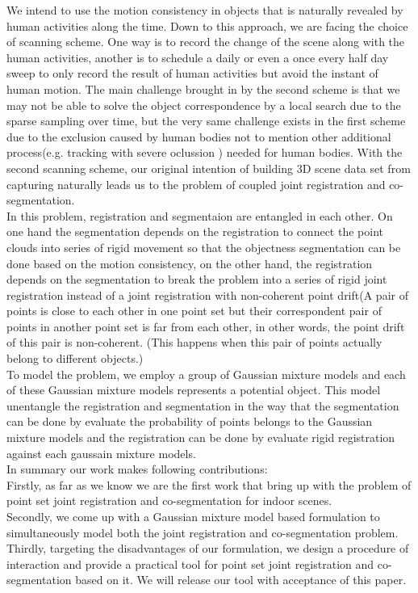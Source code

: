 We intend to use the motion consistency in objects that is naturally revealed by human activities along the time. Down to this approach, we are facing the choice of scanning scheme. One way is to record the change of the scene along with the human activities, another is to  schedule a daily or even a once every half day sweep to only record the result of human activities but avoid the instant of human motion. The main challenge brought in by the second scheme is that we may not be able to solve the object correspondence by a local search due to the sparse sampling over time, but the very same challenge exists in the first scheme due to the exclusion caused by human bodies not to mention other additional process(e.g. tracking with severe oclussion ) needed for human bodies. With the second scanning scheme, our original intention of building 3D scene data set from capturing naturally leads us to the problem of coupled joint registration and co-segmentation.\\ 
In this problem, registration and segmentaion are entangled in each other. On one hand the segmentation depends on the registration to connect the point clouds into series of rigid movement so that the objectness segmentation can be done based on the motion consistency, on the other hand, the registration depends on the segmentation to break the problem into a series of rigid joint registration instead of a joint registration with non-coherent point drift(A pair of points is close to each other in one point set but their correspondent pair of points in another point set is far from each other, in other words, the point drift of this pair is non-coherent. (This happens when this pair of points actually belong to different objects.)\\
To model the problem, we employ a group of Gaussian mixture models and each of these Gaussian mixture models represents a potential object. This model unentangle the registration and segmentation in the way that the segmentation can be done by evaluate the probability of points belongs to the Gaussian mixture models and the registration can be done by evaluate rigid registration against each gaussain mixture models.\\
In summary our work makes following contributions: \\
Firstly, as far as we know we are the first work that bring up with the problem of point set joint registration and co-segmentation for indoor scenes.\\
Secondly, we come up with a Gaussian mixture model based formulation to simultaneously model both the joint registration and co-segmentation problem.\\
Thirdly, targeting the disadvantages of our formulation, we design a procedure of interaction and provide a practical tool for point set joint registration and co-segmentation based on it. We will release our tool with acceptance of this paper.
